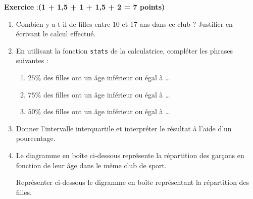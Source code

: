 \documentclass[10pt,french]{article}
\newcounter{exoc}
\newenvironment{exoc}[1]{%
  \refstepcounter{exoc}\textbf{Exercice \theexoc} :\hfill {\textbf{(#1)}}\par
  \medskip}%
{\medskip}
\begin{document}
\begin{exoc}{1 + 1,5 + 1 + 1,5 + 2 = 7 points}
    \begin{enumerate}
        \item Combien y a t-il de filles entre $10$ et $17$ ans dans ce club ? Justifier en écrivant le calcul effectué.\par{}
        \item En utilisant la fonction \texttt{stats} de la calculatrice, compléter les phrases suivantes :\medskip
        \begin{enumerate}
            \item $25\%$ des filles ont un âge inférieur ou égal à \ldots \bigskip
            \item $75\%$ des filles ont un âge inférieur ou égal à \ldots \bigskip
            \item $50\%$ des filles ont un âge inférieur ou égal à \ldots
        \end{enumerate}
        \item Donner l'intervalle interquartile et interpréter le résultat à l'aide d'un pourcentage.\par{}
        \item Le diagramme en boîte ci-dessous représente la répartition des garçons en fonction de leur âge dans le même club de sport.\par
        Représenter ci-dessous le digramme en boîte représentant la répartition des filles.
            

\end{enumerate}
\end{exoc}
\end{document}
